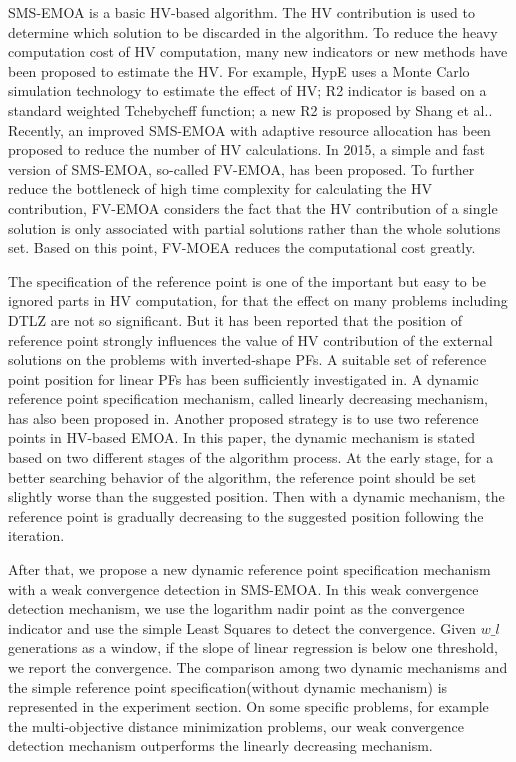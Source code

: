 \documentclass[conference]{IEEEtran}
\begin{document}
SMS-EMOA\cite{smsemoa} is a basic HV-based algorithm. 
The HV contribution is used to determine which solution to be discarded in the algorithm. 
To reduce the heavy computation cost of HV computation, 
many new indicators or new methods have been proposed to estimate the HV. 
For example, HypE uses a Monte Carlo simulation technology to estimate the effect of HV\cite{HypE}; 
R2 indicator is based on a standard weighted Tchebycheff function\cite{R2}; 
a new R2 is proposed by Shang et al.\cite{newR2}. 
Recently, an improved SMS-EMOA with adaptive resource allocation has been proposed to reduce the number of HV calculations\cite{ismsemoa}.  
In 2015, a simple and fast version of SMS-EMOA\cite{smsemoa}, so-called FV-EMOA, has been proposed\cite{FVEMOA}.
To further reduce the bottleneck of high time complexity for calculating the HV contribution, 
FV-EMOA considers the fact that the HV contribution of a single solution 
is only associated with partial solutions rather than the whole solutions set\cite{FVEMOA}. 
Based on this point, FV-MOEA reduces the computational cost greatly. 

The specification of the reference point is one of the important but easy to be ignored parts in HV computation, 
for that the effect on many problems including DTLZ\cite{DTLZ} are not so significant. 
But it has been reported that the position of reference point strongly influences the value of
HV contribution of the external solutions on the problems with inverted-shape PFs\cite{hisao:RPhowtoSpecify, hisao:RPspecify, hisao:RPexplanation}. 
A suitable set of reference point position for linear PFs has been sufficiently investigated in\cite{hisao:RPspecify}.
A dynamic reference point specification mechanism, called linearly decreasing mechanism, has also been proposed in\cite{hisao:dynamic}.
Another proposed strategy is to use two reference points in HV-based EMOA\cite{hisao:twoRP}. 
In this paper, the dynamic mechanism is stated based on two different stages of the algorithm process. 
At the early stage, for a better searching behavior of the algorithm, 
the reference point should be set slightly worse than the suggested position.
Then with a dynamic mechanism, the reference point is gradually decreasing to the suggested position following the iteration. 

After that, we propose a new dynamic reference point specification mechanism with a weak convergence detection in SMS-EMOA. 
In this weak convergence detection mechanism, we use the logarithm nadir point as the convergence indicator
and use the simple Least Squares\cite{SimpleLeastSquares} to detect the convergence. 
Given $w\_l$ generations as a window, if the slope of linear regression is below one threshold, we report the convergence.
The comparison among two dynamic mechanisms and the simple reference point specification(without dynamic mechanism) is 
represented in the experiment section. On some specific problems, for example the multi-objective distance minimization problems\cite{dmp},
our weak convergence detection mechanism outperforms the linearly decreasing mechanism. 
\end{document}
